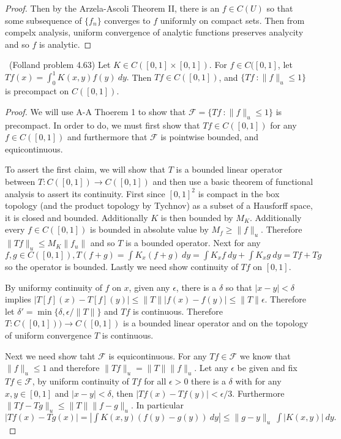 \documentclass[11pt]{amsart}
\theoremstyle{definition}
\numberwithin{theorem}{section}
\numberwithin{definition}{section}
\numberwithin{equation}{section}
\def\scriptf{{\mathcal F}}
\begin{document}
\begin{proof}
 	 Then by the Arzela-Ascoli Theorem II, there is an $f \in C(U)$ so that some subsequence of $\{f_n\}$ converges to $f$ uniformly on compact sets. Then from compelx analysis, uniform convergence of analytic functions preserves analycity and so $f$ is analytic.
\end{proof}
\medskip {}\ (Folland problem 4.63) Let $K \in C([0,1] \times [0,1])$. For $f \in C([0,1]$, let $Tf(x) = \int_0^1 K(x,y) f(y)\ dy.$ Then $Tf \in C([0,1])$, and $\{Tf\ : \|f\|_u \leq 1\}$ is precompact on $C([0,1])$.
\begin{proof}
	We will use A-A Thoerem 1 to show that $\scriptf = \{Tf\ : \|f\|_u \leq 1\}$ is precompact. In order to do,
	we must first show that $Tf \in C([0,1])$ for any $f \in C([0,1])$ and furthermore that $\scriptf$ is pointwise bounded, and equicontinuous.

	To assert the first claim, we will show that $T$ is a bounded linear operator between $T: C([0,1]) \to C([0,1])$ 
	and then use a basic theorem of functional analysis to assert its continuity. First since $[0,1]^2$ is compact in the box
	topology (and the product topology by Tychnov) as a subset of a Hausforff space, it is closed and bounded. Additionally $K$ is then bounded by $M_K$. Additionally every $f \in C([0,1])$ is bounded in absolute value by $M_f \geq \|f\|_u.$ Therefore $\|Tf\|_u \leq M_K\|f_u\|$ and so $T$ is a bounded operator. Next for any $f,g \in C([0,1]), T(f+g) = \int K_x (f+ g)\ dy = \int K_x f\ dy + \int K_x g\ dy = Tf + Tg$ so the operator is bounded. Lastly we need show continuity of $Tf$ on $[0,1].$

	By uniformy continuity of $f$ on $x$, given any $\epsilon$, there is a $\delta$ so that $|x-y| < \delta$ implies  $|T[f](x) - T[f](y)| \leq \|T\||f(x) - f(y)| \leq \|T\|\epsilon$. Therefore let $\delta' = \min\{\delta, \epsilon/\|T\|\}$ and $Tf$ is continuous. Therefore $T: C([0,1])) \to C([0,1])$ is a bounded linear operator and on the topology of uniform convergence $T$ is continuous. 

	Next we need show taht $\scriptf$ is equicontinuous. For any $Tf \in \scriptf$ we know that $\|f\|_u \leq 1$ and therefore $\|Tf\|_u =\|T\|\|f\|_u$. Let any $\epsilon$ be given and fix $Tf \in \scriptf$, by uniform continuity of $Tf$ for all $\epsilon > 0$ there is a $\delta$ with  for any $x,y \in [0,1]$ and $|x -y| < \delta$, then $|Tf(x) - Tf(y)| < \epsilon/3.$ Furthermore $\|Tf -Tg\|_u \leq \|T\|\|f-g\|_u$. In particular $|Tf(x) - Tg(x)| = |\int K(x,y) (f(y) - g(y))\ dy| \leq \|g -y\|_u\ \int |K(x,y)|\ dy.$


\end{proof}
\end{document}
